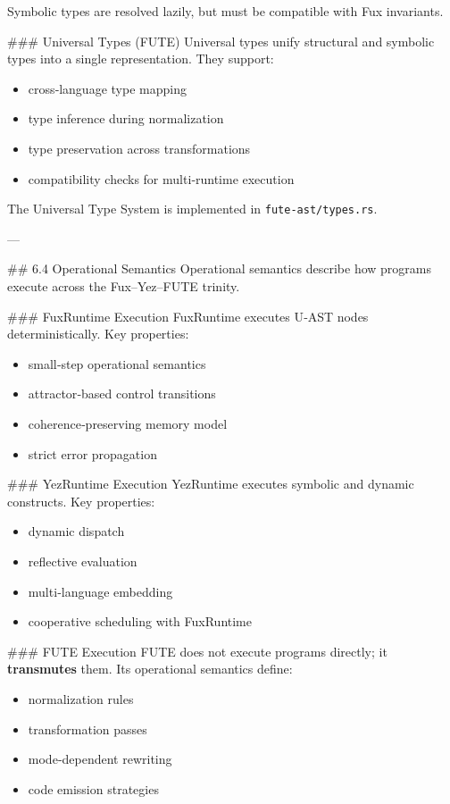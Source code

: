 \documentclass[12pt, a4paper]{book}
\begin{document}
Symbolic types are resolved lazily, but must be compatible with Fux invariants.

\#\#\# Universal Types (FUTE)  
Universal types unify structural and symbolic types into a single representation. They support:  
\begin{itemize}
  \item cross‑language type mapping  
  \item type inference during normalization  
  \item type preservation across transformations  
  \item compatibility checks for multi‑runtime execution
\end{itemize}

The Universal Type System is implemented in \texttt{fute-ast/types.rs}.

---

\#\# 6.4 Operational Semantics  
Operational semantics describe how programs execute across the Fux–Yez–FUTE trinity.

\#\#\# FuxRuntime Execution  
FuxRuntime executes U‑AST nodes deterministically.  
Key properties:  
\begin{itemize}
  \item small‑step operational semantics  
  \item attractor‑based control transitions  
  \item coherence‑preserving memory model  
  \item strict error propagation
\end{itemize}

\#\#\# YezRuntime Execution  
YezRuntime executes symbolic and dynamic constructs.  
Key properties:  
\begin{itemize}
  \item dynamic dispatch  
  \item reflective evaluation  
  \item multi‑language embedding  
  \item cooperative scheduling with FuxRuntime
\end{itemize}

\#\#\# FUTE Execution  
FUTE does not execute programs directly; it \textbf{transmutes} them.  
Its operational semantics define:  
\begin{itemize}
  \item normalization rules  
  \item transformation passes  
  \item mode‑dependent rewriting  
  \item code emission strategies
\end{itemize}
\end{document}
